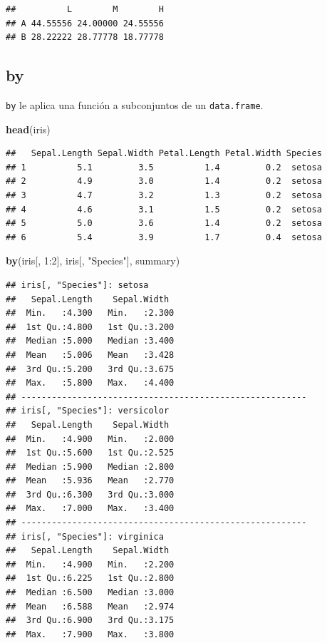 \documentclass[]{article}
\newenvironment{Shaded}{\begin{snugshade}}{\end{snugshade}}
\newcommand{\KeywordTok}[1]{\textcolor[rgb]{0.13,0.29,0.53}{\textbf{{#1}}}}
\newcommand{\DecValTok}[1]{\textcolor[rgb]{0.00,0.00,0.81}{{#1}}}
\newcommand{\StringTok}[1]{\textcolor[rgb]{0.31,0.60,0.02}{{#1}}}
\newcommand{\NormalTok}[1]{{#1}}
\begin{document}
\begin{verbatim}
##          L        M        H
## A 44.55556 24.00000 24.55556
## B 28.22222 28.77778 18.77778
\end{verbatim}

\subsection{by}\label{by}

\texttt{by} le aplica una función a subconjuntos de un
\texttt{data.frame}.

\begin{Shaded}
\begin{Highlighting}[]
\KeywordTok{head}\NormalTok{(iris)}
\end{Highlighting}
\end{Shaded}

\begin{verbatim}
##   Sepal.Length Sepal.Width Petal.Length Petal.Width Species
## 1          5.1         3.5          1.4         0.2  setosa
## 2          4.9         3.0          1.4         0.2  setosa
## 3          4.7         3.2          1.3         0.2  setosa
## 4          4.6         3.1          1.5         0.2  setosa
## 5          5.0         3.6          1.4         0.2  setosa
## 6          5.4         3.9          1.7         0.4  setosa
\end{verbatim}

\begin{Shaded}
\begin{Highlighting}[]
\KeywordTok{by}\NormalTok{(iris[, }\DecValTok{1}\NormalTok{:}\DecValTok{2}\NormalTok{], iris[, }\StringTok{"Species"}\NormalTok{], summary)}
\end{Highlighting}
\end{Shaded}

\begin{verbatim}
## iris[, "Species"]: setosa
##   Sepal.Length    Sepal.Width   
##  Min.   :4.300   Min.   :2.300  
##  1st Qu.:4.800   1st Qu.:3.200  
##  Median :5.000   Median :3.400  
##  Mean   :5.006   Mean   :3.428  
##  3rd Qu.:5.200   3rd Qu.:3.675  
##  Max.   :5.800   Max.   :4.400  
## -------------------------------------------------------- 
## iris[, "Species"]: versicolor
##   Sepal.Length    Sepal.Width   
##  Min.   :4.900   Min.   :2.000  
##  1st Qu.:5.600   1st Qu.:2.525  
##  Median :5.900   Median :2.800  
##  Mean   :5.936   Mean   :2.770  
##  3rd Qu.:6.300   3rd Qu.:3.000  
##  Max.   :7.000   Max.   :3.400  
## -------------------------------------------------------- 
## iris[, "Species"]: virginica
##   Sepal.Length    Sepal.Width   
##  Min.   :4.900   Min.   :2.200  
##  1st Qu.:6.225   1st Qu.:2.800  
##  Median :6.500   Median :3.000  
##  Mean   :6.588   Mean   :2.974  
##  3rd Qu.:6.900   3rd Qu.:3.175  
##  Max.   :7.900   Max.   :3.800
\end{verbatim}
\end{document}
